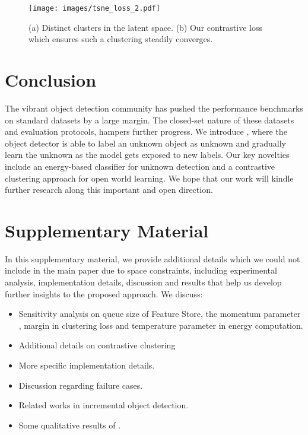 \documentclass[final]{cvpr}
\begin{document}
\begin{figure}
\texttt{[image: images/tsne\_loss\_2.pdf]}
\vspace{-20pt}
\caption{(a) Distinct clusters in the latent space.  (b) Our contrastive loss which ensures such a clustering steadily converges.}
\label{fig:tsne_loss}\vspace{-0.3em}
\end{figure}




\vspace{0.5em}
\section{Conclusion}\label{sec:conclusion}\vspace{-0.5em}
The vibrant object detection community has pushed the performance benchmarks on standard datasets by a large margin. The closed-set nature of these datasets and evaluation protocols, hampers further progress. We introduce \OWOD, where the object detector is able to label an unknown object as unknown and gradually learn the unknown as the model gets exposed to new labels. Our key novelties include an energy-based classifier for unknown detection and a contrastive clustering approach for open world learning.  We hope that our work will kindle further research along this important and open direction.











{\small


}




\clearpage
\appendix
\section*{\centering Supplementary Material}

In this supplementary material, we provide additional details which we could not include in the main paper due to space constraints, including experimental analysis, implementation details, discussion and results that help us develop further insights to the proposed \OWOD approach. We discuss:
\begin{itemize}
\setlength\itemsep{-0.15em}
    \item Sensitivity analysis on queue size of Feature Store, the momentum parameter ,  margin in clustering loss  and  temperature parameter in energy computation.
    \item Additional details on contrastive clustering
    \item More specific implementation details.
    \item Discussion regarding failure cases.
\item Related works in incremental object detection.
\item Some qualitative results of \method.
\end{itemize}
\end{document}
